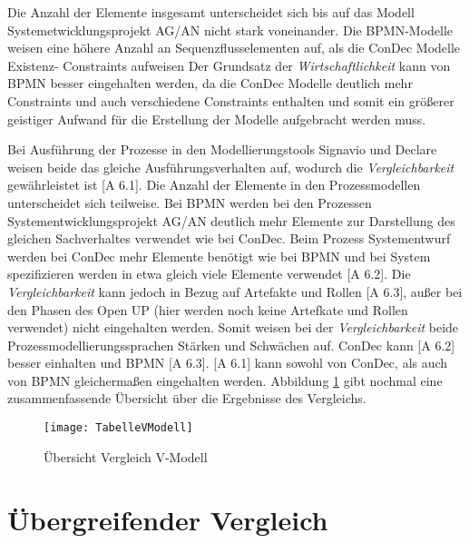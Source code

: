 {Die Anzahl der Elemente insgesamt unterscheidet sich bis auf das Modell Systemetwicklungsprojekt AG/AN nicht stark voneinander. Die BPMN-Modelle weisen eine höhere Anzahl an Sequenzflusselementen auf, als die ConDec Modelle Existenz- Constraints aufweisen
Der Grundsatz der \textit{Wirtschaftlichkeit} kann von BPMN besser eingehalten werden, da die ConDec Modelle deutlich mehr Constraints und auch verschiedene Constraints enthalten und somit ein größerer geistiger Aufwand für die Erstellung der Modelle aufgebracht werden muss.\newline


Bei Ausführung der Prozesse in den Modellierungstools Signavio und Declare weisen beide das gleiche Ausführungsverhalten auf, wodurch die \textit{Vergleichbarkeit} gewährleistet ist [A 6.1]. \newline
Die Anzahl der Elemente in den Prozessmodellen unterscheidet sich teilweise. Bei BPMN werden bei den Prozessen Systementwicklungsprojekt AG/AN deutlich mehr Elemente zur Darstellung des gleichen Sachverhaltes verwendet wie bei ConDec. Beim Prozess Systementwurf werden bei ConDec mehr Elemente benötigt wie bei BPMN und bei System spezifizieren werden in etwa gleich viele Elemente verwendet [A 6.2].\newline
Die \textit{Vergleichbarkeit} kann jedoch in Bezug auf Artefakte und Rollen [A 6.3], außer bei den Phasen des Open UP (hier werden noch keine Artefkate und Rollen verwendet) nicht eingehalten werden.\newline
Somit weisen bei der \textit{Vergleichbarkeit} beide Prozessmodellierungssprachen Stärken und Schwächen auf. ConDec kann [A 6.2] besser einhalten und BPMN [A 6.3]. [A 6.1] kann sowohl von ConDec, als auch von BPMN gleichermaßen eingehalten werden. \newline
Abbildung \ref{fig:TabelleVModell} gibt nochmal eine zusammenfassende Übersicht über die Ergebnisse des Vergleichs. 


\begin{figure}[!htbp]
\begin{center}
  \texttt{[image: TabelleVModell]} %
  \caption{Übersicht Vergleich V-Modell}
  \label{fig:TabelleVModell}
\end{center}
\end{figure}


\section{Übergreifender Vergleich}

}
